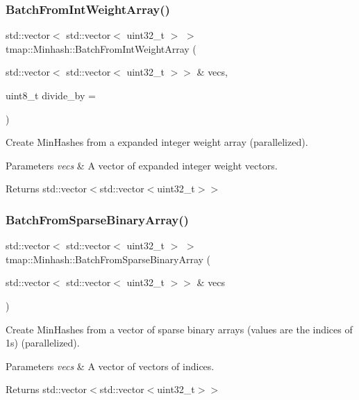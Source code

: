 \subsubsection{\texorpdfstring{Batch\+From\+Int\+Weight\+Array()}{BatchFromIntWeightArray()}}
{\footnotesize\ttfamily std\+::vector$<$ std\+::vector$<$ uint32\+\_\+t $>$ $>$ tmap\+::\+Minhash\+::\+Batch\+From\+Int\+Weight\+Array (\begin{DoxyParamCaption}\item[{std\+::vector$<$ std\+::vector$<$ uint32\+\_\+t $>$$>$ \&}]{vecs,  }\item[{uint8\+\_\+t}]{divide\+\_\+by = {} }\end{DoxyParamCaption})}



Create Min\+Hashes from a expanded integer weight array (parallelized). 


\begin{DoxyParams}{Parameters}
{\em vecs} & A vector of expanded integer weight vectors. \\
\hline
\end{DoxyParams}
\begin{DoxyReturn}{Returns}
std\+::vector$<$std\+::vector$<$uint32\+\_\+t$>$$>$ 
\end{DoxyReturn}
\mbox{\label{classtmap_1_1Minhash_a490cf682e7445393fcf2908d74498ea5}} 
\subsubsection{\texorpdfstring{Batch\+From\+Sparse\+Binary\+Array()}{BatchFromSparseBinaryArray()}}
{\footnotesize\ttfamily std\+::vector$<$ std\+::vector$<$ uint32\+\_\+t $>$ $>$ tmap\+::\+Minhash\+::\+Batch\+From\+Sparse\+Binary\+Array (\begin{DoxyParamCaption}\item[{std\+::vector$<$ std\+::vector$<$ uint32\+\_\+t $>$$>$ \&}]{vecs }\end{DoxyParamCaption})}



Create Min\+Hashes from a vector of sparse binary arrays (values are the indices of 1s) (parallelized). 


\begin{DoxyParams}{Parameters}
{\em vecs} & A vector of vectors of indices. \\
\hline
\end{DoxyParams}
\begin{DoxyReturn}{Returns}
std\+::vector$<$std\+::vector$<$uint32\+\_\+t$>$$>$ 
\end{DoxyReturn}
\mbox{\label{classtmap_1_1Minhash_a9382e443b9f622c4564449373051d006}} 
